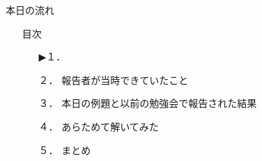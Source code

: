 \begin{frame}{本日の流れ}
  \begin{itemize}
     \item[] 目次
     \begin{itemize}[itemsep=1.3ex, leftmargin=1cm]
        \item[▶１．] 
        \item[２．] 報告者が当時できていたこと
        \item[３．] 本日の例題と以前の勉強会で報告された結果
        \item[４．] あらためて解いてみた
        \item[５．] まとめ
     \end{itemize}
  \end{itemize}
\end{frame}
